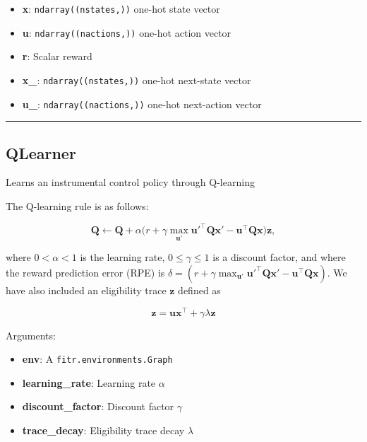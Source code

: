 \begin{itemize}
\tightlist
\item
  \textbf{x}: \texttt{ndarray((nstates,))} one-hot state vector
\item
  \textbf{u}: \texttt{ndarray((nactions,))} one-hot action vector
\item
  \textbf{r}: Scalar reward
\item
  \textbf{x\_}: \texttt{ndarray((nstates,))} one-hot next-state vector
\item
  \textbf{u\_}: \texttt{ndarray((nactions,))} one-hot next-action vector
\end{itemize}

\begin{center}\rule{0.5\linewidth}{\linethickness}\end{center}

\subsection{QLearner}\label{qlearner}

\begin{Shaded}
\begin{Highlighting}[]
\end{Highlighting}
\end{Shaded}

Learns an instrumental control policy through Q-learning

The Q-learning rule is as follows:

\[
\mathbf Q \gets \mathbf Q + \alpha \big(r + \gamma \max_{\mathbf u'} \mathbf u'^\top \mathbf Q \mathbf x' - \mathbf u^\top \mathbf Q \mathbf x \big) \mathbf z,
\]

where \(0 < \alpha < 1\) is the learning rate, \(0 \leq \gamma \leq 1\)
is a discount factor, and where the reward prediction error (RPE) is
\(\delta = (r + \gamma \max_{\mathbf u'} \mathbf u'^\top \mathbf Q \mathbf x' - \mathbf u^\top \mathbf Q \mathbf x)\).
We have also included an eligibility trace \(\mathbf z\) defined as

\[
\mathbf z = \mathbf u \mathbf x^\top +  \gamma \lambda \mathbf z
\]

Arguments:

\begin{itemize}
\tightlist
\item
  \textbf{env}: A \texttt{fitr.environments.Graph}
\item
  \textbf{learning\_rate}: Learning rate \(\alpha\)
\item
  \textbf{discount\_factor}: Discount factor \(\gamma\)
\item
  \textbf{trace\_decay}: Eligibility trace decay \(\lambda\)
\end{itemize}

